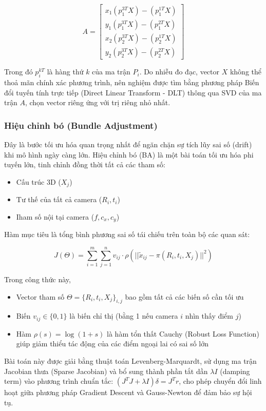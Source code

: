 $$A = \begin{bmatrix} 
x_1 (p_{1}^{3T} X) - (p_{1}^{1T} X) \\ 
y_1 (p_{1}^{3T} X) - (p_{1}^{2T} X) \\ 
x_2 (p_{2}^{3T} X) - (p_{2}^{1T} X) \\ 
y_2 (p_{2}^{3T} X) - (p_{2}^{2T} X) 
\end{bmatrix}$$

Trong đó $p_{i}^{kT}$ là hàng thứ $k$ của ma trận $P_i$. Do nhiễu đo đạc, vector $X$ không thể thoả mãn chính xác phương trình, nên nghiệm được tìm bằng phương pháp Biến đổi tuyến tính trực tiếp (Direct Linear Transform - DLT) thông qua SVD của ma trận $A$, chọn vector riêng ứng với trị riêng nhỏ nhất.

\subsubsection{Hiệu chỉnh bó (Bundle Adjustment)}

Đây là bước tối ưu hóa quan trọng nhất để ngăn chặn sự tích lũy sai số (drift) khi mô hình ngày càng lớn. Hiệu chỉnh bó (BA) là một bài toán tối ưu hóa phi tuyến lớn, tinh chỉnh đồng thời tất cả các tham số: 
\begin{itemize}
    \item Cấu trúc 3D ($X_j$)
    \item Tư thế của tất cả camera ($R_i, t_i$)
    \item Iham số nội tại camera ($f, c_x, c_y$)
\end{itemize}

Hàm mục tiêu là tổng bình phương sai số tái chiếu trên toàn bộ các quan sát:

$$J(\Theta) = \sum_{i=1}^{m} \sum_{j=1}^{n} v_{ij} \cdot \rho \left( || \tilde{x}_{ij} - \pi(R_i, t_i, X_j) ||^2 \right)$$

Trong công thức này, 
\begin{itemize}
    \item Vector tham số $\Theta = \{R_i, t_i, X_j\}_{i,j}$ bao gồm tất cả các biến số cần tối ưu
    \item  Biến $v_{ij} \in \{0, 1\}$ là biến chỉ thị (bằng 1 nếu camera $i$ nhìn thấy điểm $j$)
    \item Hàm $\rho(s) = \log(1+s)$ là hàm tổn thất Cauchy (Robust Loss Function) giúp giảm thiểu tác động của các điểm ngoại lai có sai số lớn
\end{itemize}

Bài toán này được giải bằng thuật toán Levenberg-Marquardt, sử dụng ma trận Jacobian thưa (Sparse Jacobian) và bổ sung thành phần tắt dần $\lambda I$ (damping term) vào phương trình chuẩn tắc: $(J^T J + \lambda I)\delta = J^T r$, cho phép chuyển đổi linh hoạt giữa phương pháp Gradient Descent và Gauss-Newton để đảm bảo sự hội tụ.

